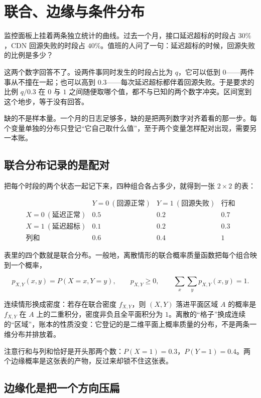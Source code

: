 \section{联合、边缘与条件分布}
\label{sec:05-Probability/05-Joint-Distributions/01}

监控面板上挂着两条独立统计的曲线。过去一个月，接口延迟超标的时段占 \(30\%\)，CDN 回源失败的时段占 \(40\%\)。值班的人问了一句：延迟超标的时候，回源失败的比例是多少？

这两个数字回答不了。设两件事同时发生的时段占比为 \(q\)，它可以低到 \(0\)——两件事从不撞在一起；也可以高到 \(0.3\)——每次延迟超标都伴着回源失败。于是要求的比例 \(q/0.3\) 在 \(0\) 与 \(1\) 之间随便取哪个值，都不与已知的两个数字冲突。区间宽到这个地步，等于没有回答。

缺的不是样本量。一个月的日志足够多，缺的是把两列数字对齐着看的那一步。每个变量单独的分布只登记``它自己取什么值''，至于两个变量怎样配对出现，需要另一本账。

\subsection{联合分布记录的是配对}

把每个时段的两个状态一起记下来，四种组合各占多少，就得到一张 \(2\times2\) 的表：

\[
\begin{array}{c|cc|c}
&Y=0\ (\text{回源正常})&Y=1\ (\text{回源失败})&\text{行和}\\
\hline
X=0\ (\text{延迟正常})&0.5&0.2&0.7\\
X=1\ (\text{延迟超标})&0.1&0.2&0.3\\
\hline
\text{列和}&0.6&0.4&1
\end{array}
\]

表里的四个数就是联合分布。一般地，离散情形的联合概率质量函数把每个组合映到一个概率，

\[
p_{X,Y}(x,y)=P(X=x,Y=y),\qquad
p_{X,Y}\ge 0,\qquad
\sum_x\sum_y p_{X,Y}(x,y)=1.
\]

连续情形换成密度：若存在联合密度 \(f_{X,Y}\)，则 \((X,Y)\) 落进平面区域 \(A\) 的概率是 \(f_{X,Y}\) 在 \(A\) 上的二重积分，密度非负且全平面积分为 \(1\)。离散的``格子''换成连续的``区域''，账本的性质没变：它登记的是二维平面上概率质量的分布，不是两条一维分布并排放着。

注意行和与列和恰好是开头那两个数：\(P(X=1)=0.3\)，\(P(Y=1)=0.4\)。两个边缘概率是这张表的产物，反过来却锁不住这张表。

\subsection{边缘化是把一个方向压扁}

